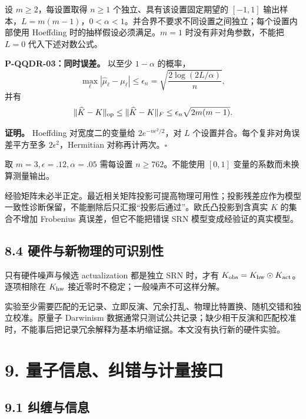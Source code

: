 \documentclass[
  11pt,
  oneside]{book}
\begin{document}
设 \(m\ge2\)，每设置取得 \(n\ge1\) 个独立、具有该设置固定期望的
\([-1,1]\)
输出样本，\(L=m(m-1)\)，\(0<\alpha<1\)。并合界不要求不同设置之间独立；每个设置内部使用
Hoeffding 时的抽样假设必须满足。\(m=1\) 时没有非对角参数，不能把 \(L=0\)
代入下述对数公式。

\protect\hypertarget{p-qqdr-03}{}{}

\textbf{P-QQDR-03：同时误差。} 以至少 \(1-\alpha\) 的概率， \[
\max_\ell|\widehat\mu_\ell-\mu_\ell|
\le\epsilon_n=\sqrt{\frac{2\log(2L/\alpha)}n},
\] 并有 \[
\|\widehat K-K\|_{\rm op}\le\|\widehat K-K\|_F
\le\epsilon_n\sqrt{2m(m-1)}.
\]

\textbf{证明。} Hoeffding 对宽度二的变量给 \(2e^{-n\epsilon^2/2}\)，对
\(L\) 个设置并合。每个复非对角误差平方至多 \(2\epsilon^2\)，Hermitian
对称再计两次。\(\square\)

取 \(m=3,\epsilon=.12,\alpha=.05\) 需每设置 \(n\ge762\)。不能使用
\([0,1]\) 变量的系数而未换算测量输出。

经验矩阵未必半正定。最近相关矩阵投影可提高物理可用性；投影残差应作为模型一致性诊断保留，不能删除后只汇报``投影后通过''。欧氏凸投影到含真实
\(K\) 的集合不增加 Frobenius 真误差，但它不能把错误 SRN
模型变成经验证的真实模型。

\hypertarget{ux786cux4ef6ux4e0eux65b0ux7269ux7406ux7684ux53efux8bc6ux522bux6027}{%
\section{8.4
硬件与新物理的可识别性}\label{ux786cux4ef6ux4e0eux65b0ux7269ux7406ux7684ux53efux8bc6ux522bux6027}}

只有硬件噪声与候选 actualization 都是独立 SRN 时，才有
\(K_{\rm obs}=K_{\rm hw}\odot K_{\rm act}\)。 逐项相除在 \(K_{\rm hw}\)
接近零时不稳定；一般噪声不可这样分解。

实验至少需要匹配的无记录、立即反演、冗余打乱、物理比特置换、随机交错和独立校准。原量子
Darwinism
数据通常只测试公共记录；缺少相干反演和匹配校准时，不能事后把记录冗余解释为基本坍缩证据。本文没有执行新的硬件实验。

\hypertarget{ch-9}{%
\chapter{9. 量子信息、纠错与计量接口}\label{ch-9}}

\hypertarget{ux7ea0ux7f20ux4e0eux4fe1ux606f}{%
\section{9.1 纠缠与信息}\label{ux7ea0ux7f20ux4e0eux4fe1ux606f}}
\end{document}
